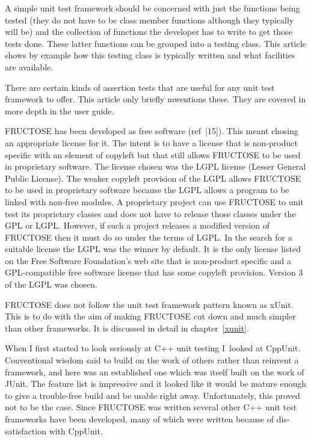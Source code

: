 \documentclass{book}
\begin{document}
A simple unit test framework should be concerned with just the functions being
tested (they do not have to be class member functions although they typically
will be) and the collection of functions the developer has to write to get
those tests done. These latter functions can be grouped into a testing class.
This article shows by example how this testing class is typically written
and what facilities are available.

There are certain kinds of assertion tests that are useful for any
unit test framework to offer. This article only briefly mwentions these.
They are covered in more depth in the user guide.

FRUCTOSE has been developed as free software (ref~[15]).
This meant chosing an appropriate license for it.
The intent is to have a license that is non-product specific
with an element of copyleft but that still
allows FRUCTOSE to be used in proprietary software.
The license chosen was the LGPL license (Lesser General Public License).
The weaker copyleft provision of the LGPL allows FRUCTOSE to be used in 
proprietary software because the LGPL allows a program to be linked 
with non-free modules.
A proprietary project can use FRUCTOSE to unit test its proprietary
classes and does not have to release those classes under the GPL or LGPL.
However, if such a project releases a modified
version of FRUCTOSE then it must do so under the terms of LGPL.
In the search for a suitable license the LGPL was the winner by default.
It is the only license listed on the Free Software Foundation's
web site that is non-product specific and
a GPL-compatible free software license that has
some copyleft provision. Version 3 of the LGPL was chosen.

FRUCTOSE does not follow the unit test framework pattern known as xUnit.
This is to do with the aim of making FRUCTOSE cut down and much simpler
than other frameworks. It is discussed in detail in
chapter~\ref{xunit}.


When I first started to look seriously at C++ unit testing I~looked at
CppUnit.  Conventional wisdom said to build on the work of others
rather than reinvent a framework, and here was an established one
which was itself built on the work of JUnit. The feature list is
impressive and it looked like it would be mature enough to give a
trouble-free build and be usable right away.  Unfortunately, this
proved not to be the case. Since FRUCTOSE was written several other
C++ unit test frameworks have been developed, many of which were
written because of dis-satisfaction with CppUnit.
\end{document}
